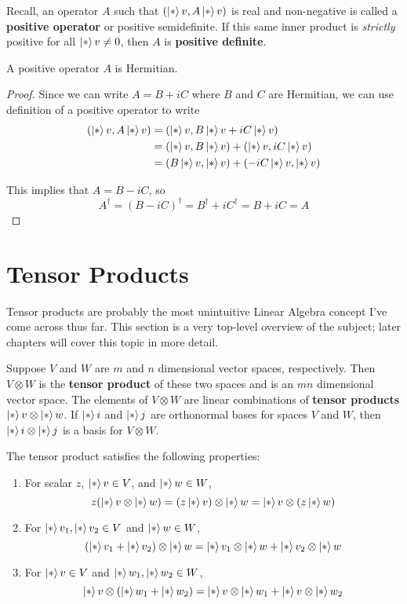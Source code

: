 Recall, an operator $A$ such that $(\ket*{v}, A\ket*{v})$ is real and non-negative is called a \textbf{positive operator} or positive semidefinite. If this same inner product is \textit{strictly} positive for all $\ket*{v} \neq 0$, then $A$ is \textbf{positive definite}. 

\begin{theorem} 
A positive operator $A$ is Hermitian. 
\end{theorem} 

\begin{proof}
Since we can write $A = B + iC$ where $B$ and $C$ are Hermitian, we can use definition of a positive operator to write 
$$
\begin{aligned}
(\ket*{v}, A \ket*{v}) &= (\ket*{v}, B\ket*{v} +iC\ket*{v}) \\ 
&= (\ket*{v}, B\ket*{v}) + (\ket*{v}, iC\ket*{v}) \\
&= (B\ket*{v}, \ket*{v}) + (-iC\ket*{v}, \ket*{v}) 
\end{aligned}
$$

This implies that $A = B - iC$, so  
$$A^{\dagger} = (B - iC)^{\dagger} = B^{\dagger} + i C^{\dagger} = B + iC = A$$
\end{proof}

\section{Tensor Products}

Tensor products are probably the most unintuitive Linear Algebra concept I've come across thus far. This section is a very top-level overview of the subject; later chapters will cover this topic in more detail. 

\begin{definition}
Suppose $V$ and $W$ are $m$ and $n$ dimensional vector spaces, respectively. Then $V \otimes W$ is the \textbf{tensor product} of these two spaces and is an $mn$ dimensional vector space. The elements of $V \otimes W$ are linear combinations of \textbf{tensor products} $\ket*{v} \otimes \ket*{w}$. If $\ket*{i}$ and $\ket*{j}$ are orthonormal bases for spaces $V$ and $W$, then $\ket*{i} \otimes \ket*{j}$ is a basis for $V \otimes W$. 
\end{definition}

The tensor product satisfies the following properties: 
\begin{enumerate}
	\item For scalar $z$, $\ket*{v} \in V$, and $\ket*{w} \in W$, $$z (\ket*{v} \otimes \ket*{w}) = (z\ket*{v}) \otimes \ket*{w} = \ket*{v} \otimes (z\ket*{w})$$
	\item For $\ket*{v_{1}}, \ket*{v_{2}} \in V$ and $\ket*{w} \in W$, $$(\ket*{v_{1}} + \ket*{v_{2}}) \otimes \ket*{w} = \ket*{v_{1}} \otimes \ket*{w} + \ket*{v_{2}} \otimes \ket*{w}$$
	\item For $\ket*{v} \in V$ and $\ket*{w_{1}}, \ket*{w_{2}} \in W$, $$\ket*{v} \otimes (\ket*{w_{1}} + \ket*{w_{2}}) = \ket*{v} \otimes \ket*{w_{1}} + \ket*{v} \otimes \ket*{w_{2}}$$
\end{enumerate}

